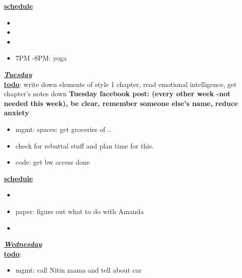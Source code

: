 \underline{\textbf{schedule}}\\
\begin{itemize}
\item
\item
\item
\item 7PM -8PM: yoga
\end{itemize}

\underline{\textbf{\textit{Tuesday}}}\\
\underline{\textbf{todo}}: write down elements of style 1 chapter, read emotional intelligence, get chapter's notes down 
\textbf{Tuesday facebook post: (every other week -not needed this week), be clear, remember someone else's name, reduce anxiety} \\
\begin{itemize}
\item mgmt: spaces: get groceries of ..
\item check for rebuttal stuff and plan time for this.
\item code: get bw access done
\end{itemize}

\underline{\textbf{schedule}}\\
\begin{itemize}
\item
\item paper: figure out what to do with Amanda
\item
{}
\end{itemize}

\underline{\textbf{\textit{Wednesday}}}\\
\underline{\textbf{todo}}:
\begin{itemize}
\item mgmt: call Nitin mama and tell about car
\end{itemize}

